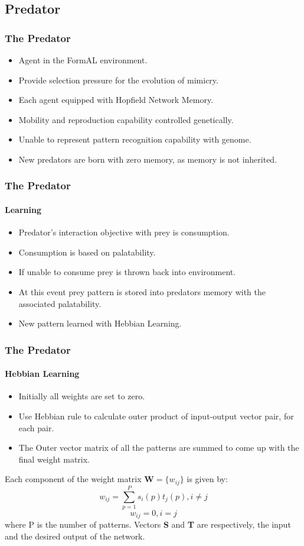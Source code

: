 \subsection{Predator}

\frame
{
	\frametitle{The Predator}
	
	\begin{itemize}
		\item Agent in the FormAL environment.
		\item Provide selection pressure for the evolution of mimicry.
		\item Each agent equipped with Hopfield Network Memory.
		\item Mobility and reproduction capability controlled genetically.
		\item Unable to represent pattern recognition capability with genome.
		\item New predators are born with zero memory, as memory is not inherited.
	\end{itemize}
}

\frame
{
	\frametitle{The Predator}
	\framesubtitle{Learning}

	\begin{itemize}
		\item Predator's interaction objective with prey is consumption.
		\item Consumption is based on palatability.
		\item If unable to consume prey is thrown back into environment.
		\item At this event prey pattern is stored into predators memory with the associated palatability.
		\item New pattern learned with Hebbian Learning.
	\end{itemize}
}

\frame
{
	\frametitle{The Predator}
	\framesubtitle{Hebbian Learning}

	\begin{itemize}
		\item Initially all weights are set to zero.
		\item Use Hebbian rule to calculate outer product of input-output vector pair, for each pair.
		\item The Outer vector matrix of all the patterns are summed to come up with the final weight matrix.
	\end{itemize}
	
Each component of the weight matrix \(\textbf{W} = \{w_{ij}\}\) is given by:
\begin{equation}
w_{ij} = \sum_{p=1}^{P} s_i(p) t_j(p), i \neq j
\end{equation}
\[
w_{ij} = 0, i = j
\]
where P is the number of patterns. Vectors \textbf{S} and \textbf{T} are respectively, the input and the desired output of the network.

}

